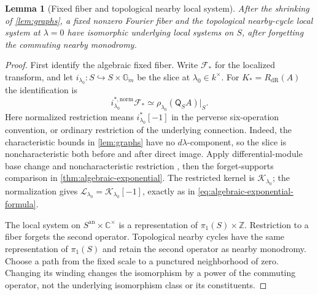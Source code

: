 \documentclass[11pt]{article}
\numberwithin{equation}{section}
\newtheorem{lemma}[lemma]{Lemma}
\theoremstyle{definition}
\theoremstyle{remark}
\newcommand{\C}{\mathbb C}
\newcommand{\Gm}{\mathbb G_m}
\newcommand{\dR}{\mathrm{dR}}
\newcommand{\Fcal}{\mathcal F}
\begin{document}
\begin{lemma}[Fixed fiber and topological nearby local system]
\label{lem:fiber-nearby}\label{prop:fiber-nearby}
After the shrinking of \cref{lem:graphs}, a fixed nonzero Fourier fiber
and the \emph{topological} nearby-cycle local system at $\lambda=0$
have isomorphic underlying local systems on $S$, after forgetting the
commuting nearby monodromy.
\end{lemma}
\begin{proof}
First identify the algebraic fixed fiber. Write $\Fcal_*$ for the
localized transform, and let
$i_{\lambda_0}:S\hookrightarrow S\times\Gm$ be the slice at
$\lambda_0\in k^\times$. For $K_*=R_{\dR}(A)$ the identification is
\begin{equation}\label{eq:fourier-fixed-fiber}
 i_{\lambda_0}^{*,\mathrm{norm}}\Fcal_*
       \simeq \rho_{\lambda_0}(\mathsf Q_S A)|_S.
\end{equation}
Here normalized restriction means $i_{\lambda_0}^*[-1]$ in the
perverse six-operation convention, or ordinary restriction of the
underlying connection. Indeed, the characteristic bounds in
\cref{lem:graphs} have no $d\lambda$-component, so the slice is
noncharacteristic both before and after direct image. Apply differential-module
base change and noncharacteristic restriction
\cite[Theorems~1.7.3 and~2.4.6]{HTT}, then the forget-supports comparison
in \cref{thm:algebraic-exponential}. The restricted kernel is
$\mathscr K_{\lambda_0}$; the normalization gives
$\mathscr L_{\lambda_0}=\mathscr K_{\lambda_0}[-1]$, exactly as in
\eqref{eq:algebraic-exponential-formula}.

The local system on $S^{\mathrm{an}}\times\C^\times$ is a representation
of $\pi_1(S)\times\mathbb Z$. Restriction to a fiber forgets the second
operator. Topological nearby cycles have the same representation of
$\pi_1(S)$ and retain the second operator as nearby monodromy. Choose
a path from the fixed scale to a punctured neighborhood of zero. Changing
its winding changes the isomorphism by a power of the commuting operator,
not the underlying isomorphism class or its constituents.
\end{proof}
\end{document}
